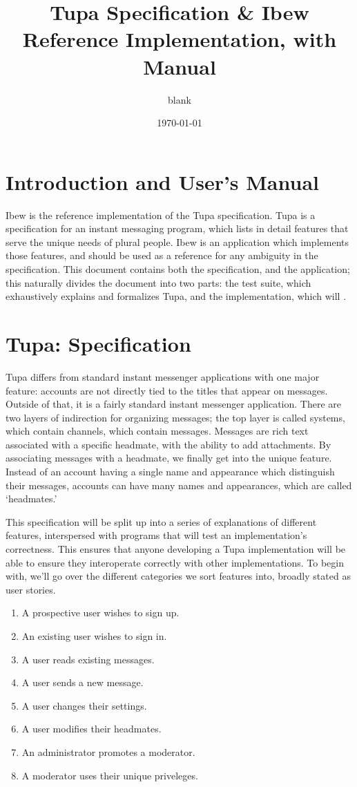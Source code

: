 \documentclass{book}
\title{Tupa Specification \& Ibew Reference Implementation, with Manual}
\author{blank}
\date{\today}
\begin{document}
\maketitle
\tableofcontents

\part{Introduction and User's Manual}
Ibew is the reference implementation of the Tupa specification.
Tupa is a specification for an instant messaging program, which lists in detail features that serve the unique needs of plural people.
Ibew is an application which implements those features, and should be used as a reference for any ambiguity in the specification.
This document contains both the specification, and the application; this naturally divides the document into two parts: the test suite, which exhaustively explains and formalizes Tupa, and the implementation, which will .


\part{Tupa: Specification}

Tupa differs from standard instant messenger applications with one major feature: accounts are not directly tied to the titles that appear on messages.
Outside of that, it is a fairly standard instant messenger application.
There are two layers of indirection for organizing messages; the top layer is called systems, which contain channels, which contain messages.
Messages are rich text associated with a specific headmate, with the ability to add attachments.
By associating messages with a headmate, we finally get into the unique feature.
Instead of an account having a single name and appearance which distinguish their messages, accounts can have many names and appearances, which are called `headmates.'

This specification will be split up into a series of explanations of different features, interspersed with programs that will test an implementation's correctness.
This ensures that anyone developing a Tupa implementation will be able to ensure they interoperate correctly with other implementations.
To begin with, we'll go over the different categories we sort features into, broadly stated as user stories.

\begin{enumerate}
\item A prospective user wishes to sign up.
\item An existing user wishes to sign in.
\item A user reads existing messages.
\item A user sends a new message.
\item A user changes their settings.
\item A user modifies their headmates.
\item An administrator promotes a moderator.
\item A moderator uses their unique priveleges.
\end{enumerate}
\end{document}
